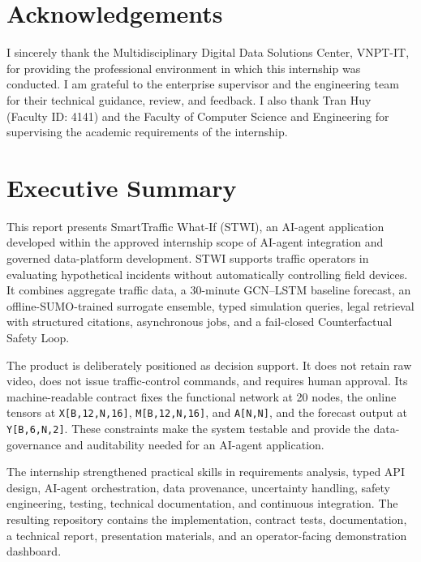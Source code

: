 \documentclass[12pt,a4paper]{report}
\begin{document}
\chapter*{Acknowledgements}

I sincerely thank the Multidisciplinary Digital Data Solutions Center, VNPT-IT, for providing the professional environment in which this internship was conducted. I am grateful to the enterprise supervisor and the engineering team for their technical guidance, review, and feedback. I also thank Tran Huy (Faculty ID: 4141) and the Faculty of Computer Science and Engineering for supervising the academic requirements of the internship.

\chapter*{Executive Summary}

This report presents SmartTraffic What-If (STWI), an AI-agent application developed within the approved internship scope of AI-agent integration and governed data-platform development. STWI supports traffic operators in evaluating hypothetical incidents without automatically controlling field devices. It combines aggregate traffic data, a 30-minute GCN--LSTM baseline forecast, an offline-SUMO-trained surrogate ensemble, typed simulation queries, legal retrieval with structured citations, asynchronous jobs, and a fail-closed Counterfactual Safety Loop.

The product is deliberately positioned as decision support. It does not retain raw video, does not issue traffic-control commands, and requires human approval. Its machine-readable contract fixes the functional network at 20 nodes, the online tensors at \texttt{X[B,12,N,16]}, \texttt{M[B,12,N,16]}, and \texttt{A[N,N]}, and the forecast output at \texttt{Y[B,6,N,2]}. These constraints make the system testable and provide the data-governance and auditability needed for an AI-agent application.

The internship strengthened practical skills in requirements analysis, typed API design, AI-agent orchestration, data provenance, uncertainty handling, safety engineering, testing, technical documentation, and continuous integration. The resulting repository contains the implementation, contract tests, documentation, a technical report, presentation materials, and an operator-facing demonstration dashboard.
\end{document}

